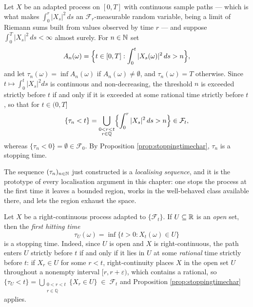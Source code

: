 \begin{example}\label{example_stoppingTimes}
    Let $X$ be an adapted process on $[0,T]$ with continuous sample paths --- which is what makes
$\int_0^r |X_s|^2\,ds$ an $\mathcal{F}_r$-measurable random variable, being a limit of Riemann sums
built from values observed by time $r$ --- and suppose $\int_0^T |X_s|^2\,ds < \infty$ almost surely. For $n \in \mathbb{N}$ set
    \[
    A_n(\omega) =  \Bigl\{ t \in [0,T] : \int_0^t |X_s(\omega)|^2\,ds > n\Bigr\},
    \]
    and let $\tau_n(\omega) = \inf A_n(\omega)$ if $A_n(\omega) \neq \emptyset$, and $\tau_n(\omega) = T$ otherwise. Since $t \mapsto \int_0^t |X_s|^2 ds$ is continuous and non-decreasing, the threshold $n$ is exceeded strictly before $t$ if and only if it is exceeded at some rational time strictly before $t$, so that for $t\in (0,T]$
    \begin{equation}
        \{\tau_n < t\} = \bigcup_{\substack{0<r<t \\ r \in \mathbb{Q}}} \Bigl\{\int_0^r |X_s|^2\,ds > n\Bigr\} \in \mathcal{F}_t,
    \end{equation}
    whereas $\{\tau_n < 0\} = \emptyset \in \mathcal{F}_0$. By Proposition \ref{prop:stoppingtimechar}, $\tau_n$ is a stopping time.

     The sequence $(\tau_n)_{n\in\mathbb{N}}$ just constructed is a \emph{localising sequence}, and it is the prototype of every localisation argument in this chapter: one stops the process at the first time it leaves a bounded region, works in the well-behaved class available there, and lets the region exhaust the space.
\end{example}

\begin{example}\label{example:hittingtime}
    Let $X$ be a right-continuous process adapted to $\{\mathcal{F}_t\}$. If $U \subseteq \mathbb{R}$ is an \emph{open} set, then the \textit{first hitting time}
    \begin{equation}\label{eq:hittingtime}
        \tau_U(\omega) = \inf\{t>0 : X_t(\omega) \in U\}
    \end{equation}
    is a stopping time. Indeed, since $U$ is open and $X$ is right-continuous, the path enters $U$ strictly before $t$ if and only if it lies in $U$ at some \emph{rational} time strictly before $t$: if $X_r \in U$ for some $r<t$, right-continuity places $X$ in the open set $U$ throughout a nonempty interval $[r,r+\varepsilon)$, which contains a rational, so
$\{\tau_U < t\} = \bigcup_{\substack{0<r<t \\ r \in \mathbb{Q}}} \{X_r \in U\} \;\in\; \mathcal{F}_t$     and Proposition \ref{prop:stoppingtimechar} applies.
\end{example}

